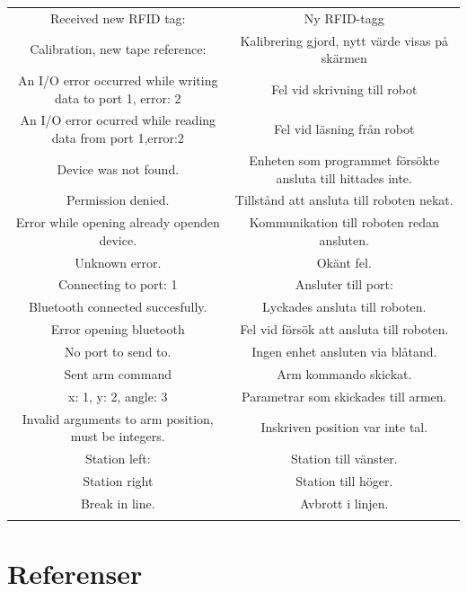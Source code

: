 \documentclass[a4paper,12pt]{article}
\begin{document}
\begin{longtable}{|c|c|}
        Received new RFID tag:  &  Ny RFID-tagg \\
        Calibration, new tape reference:  & Kalibrering gjord, nytt värde visas på skärmen \\
        An I/O error occurred while writing data to port 1, error: 2 & Fel vid skrivning till robot\\
        An I/O error ocurred while reading data from port 1,error:2 & Fel vid läsning från robot\\
        Device was not found. & Enheten som programmet försökte ansluta till hittades inte. \\
        Permission denied. & Tillstånd att ansluta till roboten nekat. \\
        Error while opening already openden device. & Kommunikation till roboten redan ansluten. \\
        Unknown error. & Okänt fel.\\
        Connecting to port: 1 & Ansluter till port: \\
        Bluetooth connected succesfully. & Lyckades ansluta till roboten. \\
        Error opening bluetooth & Fel vid försök att ansluta till roboten.\\
        No port to send to. & Ingen enhet ansluten via blåtand. \\
        Sent arm command & Arm kommando skickat. \\
        x: 1, y: 2, angle: 3 & Parametrar som skickades till armen. \\
        Invalid arguments to arm position, must be integers. & Inskriven position var inte tal. \\
        Station left:  & Station till vänster. \\
        Station right & Station till höger. \\
        Break in line. & Avbrott i linjen. \\
\label{tab:logg}
\end{longtable}


\newpage
\section*{Referenser}


\newpage
\appendix
\end{document}
